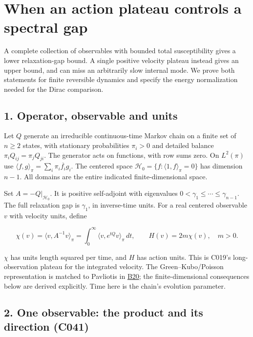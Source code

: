 \documentclass[11pt,a4paper]{article}
\begin{document}
\hypertarget{when-an-action-plateau-controls-a-spectral-gap}{%
\section{When an action plateau controls a spectral
gap}\label{when-an-action-plateau-controls-a-spectral-gap}}

A complete collection of observables with bounded total susceptibility
gives a lower relaxation-gap bound. A single positive velocity plateau
instead gives an upper bound, and can miss an arbitrarily slow internal
mode. We prove both statements for finite reversible dynamics and
specify the energy normalization needed for the Dirac comparison.

\hypertarget{operator-observable-and-units}{%
\subsection{1. Operator, observable and
units}\label{operator-observable-and-units}}

Let \(Q\) generate an irreducible continuous-time Markov chain on a
finite set of \(n\ge2\) states, with stationary probabilities
\(\pi_i>0\) and detailed balance \(\pi_iQ_{ij}=\pi_jQ_{ji}\). The
generator acts on functions, with row sums zero. On \(L^2(\pi)\) use
\(\langle f,g\rangle_\pi=\sum_i\pi_i\overline{f_i}g_i\). The centered
space \(\mathcal H_0=\{f:\langle1,f\rangle_\pi=0\}\) has dimension
\(n-1\). All domains are the entire indicated finite-dimensional space.

Set \(A=-Q|_{\mathcal H_0}\). It is positive self-adjoint with
eigenvalues \(0<\gamma_1\le\cdots\le\gamma_{n-1}\). The full relaxation
gap is \(\gamma_1\), in inverse-time units. For a real centered
observable \(v\) with velocity units, define

\[
\chi(v)=\langle v,A^{-1}v\rangle_\pi
=\int_0^\infty\langle v,e^{tQ}v\rangle_\pi\,dt,
\qquad H(v)=2m\chi(v),\quad m>0.
\]

\(\chi\) has units length squared per time, and \(H\) has action units.
This is C019's long-observation plateau for the integrated velocity. The
Green--Kubo/Poisson representation is matched to Pavliotis in
\href{../references/batches/B20.md}{B20}; the finite-dimensional
consequences below are derived explicitly. Time here is the chain's
evolution parameter.

\hypertarget{one-observable-the-product-and-its-direction-c041}{%
\subsection{2. One observable: the product and its direction
(C041)}\label{one-observable-the-product-and-its-direction-c041}}
\end{document}
